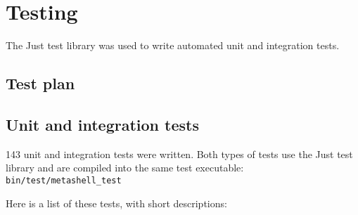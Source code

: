 
\chapter{Testing}

The Just\cite{just} test library was used to write automated unit and
integration tests.


\section{Test plan}


\section{Unit and integration tests} \label{tests}

143 unit and integration tests were written. Both types of tests use the Just
test library and are compiled into the same test executable:
\verb$bin/test/metashell_test$

Here is a list of these tests, with short descriptions:

